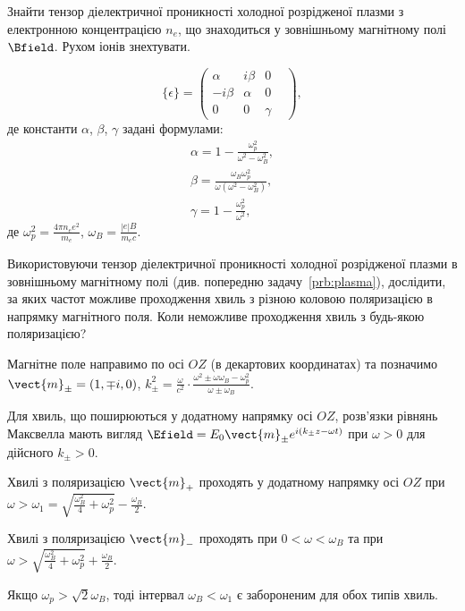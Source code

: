 \begin{problem}\label{prb:plasma}
Знайти тензор діелектричної проникності холодної розрідженої плазми з електронною концентрацією
$n_e$, що знаходиться у зовнішньому магнітному полі $\Bfield$. Рухом іонів знехтувати.
\begin{solution}
	\begin{equation*}
		\{ \epsilon \}  = \left( {\begin{array}{*{20}{c}}
				\alpha       & {i\beta } & 0      & \\
				{ - i\beta } & \alpha    & 0      & \\
				0            & 0         & \gamma &
			\end{array}} \right),
	\end{equation*}
	де константи $\alpha$, $\beta$, $\gamma$ задані формулами:
	\begin{align*}
		\alpha =  1 - \frac{\omega_p^2}{\omega ^2 - \omega _B^2},           \\
		\beta = \frac{\omega_B\omega_p^2}{\omega(\omega ^2 - \omega _B^2)}, \\
		\gamma = 1 - \frac{\omega _p^2}{\omega ^2},
	\end{align*}
	де $\omega _p^2 = \frac{4\pi n_e e^2}{m_e}$, $\omega_B = \frac{\left| e \right|B}{m_ec}$.
\end{solution}
\end{problem}

\begin{problem}
Використовуючи тензор діелектричної проникності холодної розрідженої плазми в зовнішньому магнітному
полі (див.  попередню задачу~\ref{prb:plasma}), дослідити, за яких частот можливе проходження хвиль з
різною коловою поляризацією в напрямку магнітного поля. Коли неможливе проходження хвиль з будь-якою
поляризацією?
\begin{solution}
	Магнітне поле направимо по осі $OZ$ (в декартових координатах) та позначимо \(\vect{m}_{\pm} = (1,
	\mp i,0)\), \(k_\pm^2 = \frac{\omega }{c^2} \cdot \frac{\omega^2 \pm \omega \omega_B -
	\omega_p^2}{\omega  \pm \omega_B}\).

	Для хвиль, що поширюються у додатному напрямку осі $OZ$, розв'язки рівнянь Максвелла мають вигляд
	$\Efield = E_0\vect{m}_{\pm} e^{i(k_\pm z - \omega t)}$ при $\omega > 0$ для дійсного $k_{\pm} >0$.

	Хвилі з поляризацією $\vect{m}_+$ проходять у додатному напрямку осі $OZ$ при \(\omega  > \omega_1
	= \sqrt {\frac{{\omega_B^2}}{4} + \omega_p^2}  - \frac{\omega _B}{2}\).

	Хвилі з поляризацією $\vect{m}_-$ проходять при \(0<\omega<\omega_B\)  та при\\\(\omega  > \sqrt
	{\frac{\omega_B^2}{4} + \omega_p^2}  + \frac{\omega _B}{2}\).

	Якщо \({\omega _p} > \sqrt 2 {\omega _B}\), тоді  інтервал \(\omega_B  <  \omega_1 \)  є
	забороненим для обох типів хвиль.
\end{solution}
\end{problem}

